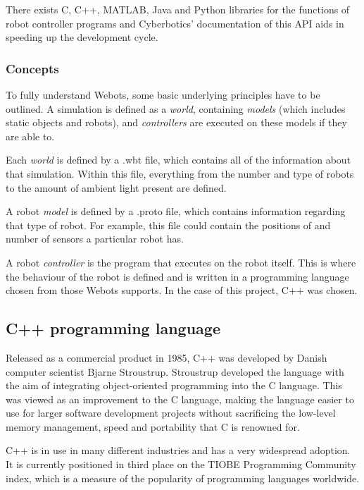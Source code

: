 There exists C, C++, MATLAB, Java and Python libraries for the functions of robot controller programs and Cyberbotics' documentation of this API aids in speeding up the development cycle.

\subsubsection{Concepts}

To fully understand Webots, some basic underlying principles have to be outlined. A simulation is defined as a \textit{world}, containing \textit{models} (which includes static objects and robots), and \textit{controllers} are executed on these models if they are able to.

Each \textit{world} is defined by a .wbt file, which contains all of the information about that simulation. Within this file, everything from the number and type of robots to the amount of ambient light present are defined.

A robot \textit{model} is defined by a .proto file, which contains information regarding that type of robot. For example, this file could contain the positions of and number of sensors a particular robot has.

A robot \textit{controller} is the program that executes on the robot itself. This is where the behaviour of the robot is defined and is written in a programming language chosen from those Webots supports. In the case of this project, C++ was chosen.

\subsection{C++ programming language}

Released as a commercial product in 1985, C++ was developed by Danish computer scientist Bjarne Stroustrup. Stroustrup developed the language with the aim of integrating object-oriented programming into the C language. This was viewed as an improvement to the C language, making the language easier to use for larger software development projects without sacrificing the low-level memory management, speed and portability that C is renowned for. \cite{c++-history}

C++ is in use in many different industries and has a very widespread adoption. It is currently positioned in third place on the TIOBE Programming Community index, which is a measure of the popularity of programming languages worldwide. \cite{tiobe}

